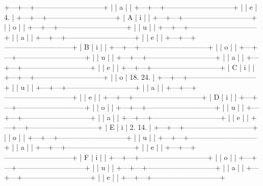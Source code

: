 +---+---+-----------------------------+
|   | a |                             |
+---+---+-----------------------------+
|   | e | 4.                          |
+---+---+-----------------------------+
| A | i |                             |
+---+---+-----------------------------+
|   | o |                             |
+---+---+-----------------------------+
|   | u |                             |
+---+---+-----------------------------+
|   | a |                             |
+---+---+-----------------------------+
|   | e |                             |
+---+---+-----------------------------+
| B | i |                             |
+---+---+-----------------------------+
|   | o |                             |
+---+---+-----------------------------+
|   | u |                             |
+---+---+-----------------------------+
|   | a |                             |
+---+---+-----------------------------+
|   | e |                             |
+---+---+-----------------------------+
| C | i |                             |
+---+---+-----------------------------+
|   | o | 18. 24.                     |
+---+---+-----------------------------+
|   | u |                             |
+---+---+-----------------------------+
|   | a |                             |
+---+---+-----------------------------+
|   | e |                             |
+---+---+-----------------------------+
| D | i |                             |
+---+---+-----------------------------+
|   | o |                             |
+---+---+-----------------------------+
|   | u |                             |
+---+---+-----------------------------+
|   | a |                             |
+---+---+-----------------------------+
|   | e |                             |
+---+---+-----------------------------+
| E | i | 2. 14.                      |
+---+---+-----------------------------+
|   | o |                             |
+---+---+-----------------------------+
|   | u |                             |
+---+---+-----------------------------+
|   | a |                             |
+---+---+-----------------------------+
|   | e |                             |
+---+---+-----------------------------+
| F | i |                             |
+---+---+-----------------------------+
|   | o |                             |
+---+---+-----------------------------+
|   | u |                             |
+---+---+-----------------------------+
|   | a |                             |
+---+---+-----------------------------+
|   | e |                             |
+---+---+-----------------------------+
